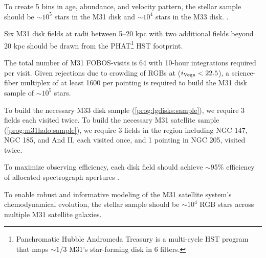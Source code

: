 \documentclass[11pt,a4paper,twoside,onecolumn,openany,final,oldfontcommands]{memoir}
\begin{document}
\begin{programrequirement}
\reqitem To create 5 bins in age, abundance, and velocity pattern, the stellar sample should be $\sim 10^5$ stars in the M31 disk and $\sim 10^4$ stars in the M33 disk. \label{prog:lgdisks:sample} .  

\reqitem Six M31 disk fields at radii between 5--20 kpc with two additional fields beyond 20 kpc should be drawn from the PHAT\footnote{Panchromatic Hubble Andromeda Treasury \citep{phat} is a multi-cycle HST program that maps $\sim1/3$ M31's star-forming disk in 6 filters.} HST footprint.  

\reqitem The total number of M31 FOBOS-visits is 64 with 10-hour integrations required per visit.  Given rejections due to crowding \citep{dorman12} of RGBs at ($i_{\rm Vega} < 22.5$), a science-fiber multiplex of at least 1600 per pointing is required to build the M31 disk sample of $\sim 10^5$ stars.



\reqitem To build the necessary M33 disk sample (\ref{prog:lgdisks:sample}), we require 3 fields each visited twice.
\reqitem To build the necessary M31 satellite sample (\ref{prog:m31halo:sample}), we require 3 fields in the region including NGC 147, NGC 185, and And II, each visited once, and 1 pointing in NGC 205, visited twice.  


\reqitem To maximize observing efficiency, each disk field should achieve $\sim$95\% efficiency of allocated spectrograph apertures .


\reqitem To enable robust and informative modeling of the M31 satellite system's chemodynamical evolution, the stellar sample should be $\sim10^{4}$ RGB stars across multiple M31 satellite galaxies.  \label{prog:m31halo:sample}

\end{programrequirement}
\end{document}
